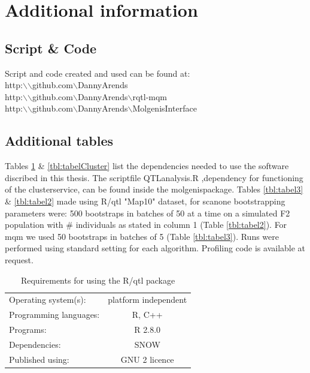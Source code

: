 \newpage
\section{Additional information}
\subsection*{Script \& Code}
Script and code created and used can be found at:\\
http:$\backslash$$\backslash$github.com$\backslash$DannyArends\\
http:$\backslash$$\backslash$github.com$\backslash$DannyArends$\backslash$rqtl-mqm\\
http:$\backslash$$\backslash$github.com$\backslash$DannyArends$\backslash$MolgenisInterface\\

\subsection*{Additional tables}
Tables \ref{tbl:tabel1} \& \ref{tbl:tabelCluster} list the dependencies needed to use the software discribed in this thesis. 
The scriptfile QTLanalysis.R ,dependency for functioning of the clusterservice,
can be found inside the molgenispackage.
Tables \ref{tbl:tabel3} \& \ref{tbl:tabel2} made using R/qtl "Map10" dataset, for scanone bootstrapping parameters were: 
500 bootstraps in batches of 50 at a time on a simulated F2 population with \# individuals as stated in column 1 (Table \ref{tbl:tabel2}).
For mqm we used 50 bootstraps in batches of 5 (Table \ref{tbl:tabel3}). Runs were performed using standard setting for each algorithm. 
Profiling code is available at request.\\

\begin{table}[ht]
	\caption{Requirements for using the R/qtl package}
	\centering
	\begin{tabular}{| l | c | }
	\hline
	Operating system(s):&platform independent\\
	Programming languages:&R, C++\\
	Programs:&R 2.8.0\\
	Dependencies:&SNOW\cite{tierney04}\\
	Published using:&GNU 2 licence\\
	\hline
	\end{tabular}
	\label{tbl:tabel1}
\end{table}

